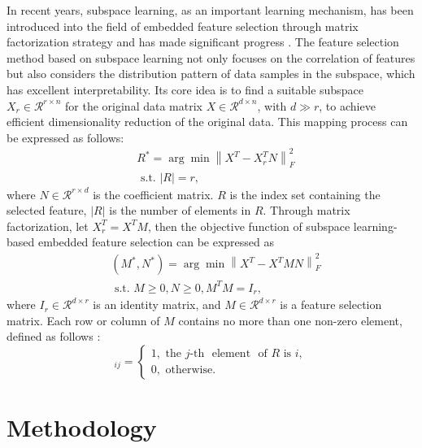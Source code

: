 \documentclass[a4paper,fleqn]{cas-sc}
\begin{document}
In recent years, subspace learning, as an important learning mechanism, has been introduced into the field of embedded feature selection through matrix factorization strategy and has made significant progress \cite{27,28}. The feature selection method based on subspace learning not only focuses on the correlation of features but also considers the distribution pattern of data samples in the subspace, which has excellent interpretability. Its core idea is to find a suitable subspace $ X_r \in \mathcal{R}^{r \times n}$ for the original data matrix $X \in \mathcal{R}^{d \times n}$, with $d \gg r$, to achieve efficient dimensionality reduction of the original data. This mapping process can be expressed as follows:
\begin{equation}
	\begin{aligned}
		&R^*=\arg  \min \left\|X^T-X_r^T N\right\|_F^2 \\
		&\text { s.t. }|R|=r,
	\end{aligned}
\end{equation}
where $N \in \mathcal{R}^{r \times d}$ is the coefficient matrix. $R$ is the index set containing the selected feature, $|R| $ is the number of elements in $R$. Through matrix factorization, let $X_r^T=X^T M$, then the objective function of subspace learning-based embedded feature selection can be expressed as
\begin{equation}
	\begin{aligned}
		&\left(M^*, N^*\right)=\arg \min \left\|X^T-X^T M N\right\|_F^2 \\
		&\text { s.t. } M \geq 0, N \geq 0, M^TM=I_r,
	\end{aligned}			
\end{equation}
where $I_r \in \mathcal{R}^{d \times r}$ is an identity matrix, and $M \in \mathcal{R}^{d \times r}$ is a feature selection matrix. Each row or column of $M$ contains no more than one non-zero element, defined as follows \cite{50}:
\begin{equation}
	[M]_{i j}=\left\{\begin{array}{l}
		1, \text { the }  j \text {-th }  \text { element }  \text { of }  R  \text { is }  i, \\
		0,  \text { otherwise. }
	\end{array}\right.
\end{equation}



\section{Methodology}
\end{document}
